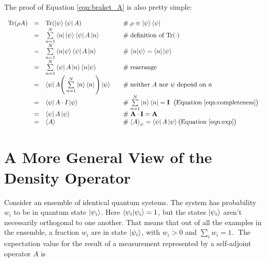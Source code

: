 \documentclass[11pt, oneside]{article}   	%
\begin{document}
\bigskip
\noindent
The proof of Equation \ref{eqn:braket_A} is also pretty simple:

\begin{equation*}
\begin{array}{rcll}
\text{Tr}(\rho A) 
&=& \text{Tr}(\ket{\psi} \bra{\psi}  A)                                                                      & \quad \mathrel{\#} \rho \equiv \ket{\psi} \bra{\psi} \\
&=& \sum\limits_{n = 1}^{N} \bra{n} \ket{\psi} \bra{\psi} A \ket{n}                          & \quad \mathrel{\#} \text{definition of Tr($\cdot$)} \\
&=& \sum\limits_{n = 1}^{N} \braket{n | \psi} \bra{\psi} A \ket{n}                           & \quad \mathrel{\#}  \braket{n | \psi}  =  \bra{n} \ket{\psi}  \\
&=& \sum\limits_{n = 1}^{N} \bra{\psi} A \ket{n} \braket{n | \psi}                           & \quad \mathrel{\#} \text{rearrange} \\
&=& \bra{\psi}  A \Bigg (\sum\limits_{n = 1}^{N} \ket{n} \bra{n} \Bigg ) \ket{\psi}   & \quad \mathrel{\#} \text{neither $A$ nor $\psi$ depend on $n$} \\
&=& \bra{\psi} A  \cdot I  \ket{\psi}                                                                         & \quad \mathrel{\#} \sum\limits_{n = 1}^{N} \ket{n} \bra{n} = \mathbf{I} \;\; \text{\big (Equation \ref{eqn:completeness}} \big )  \\
&=& \bra{\psi} A \ket{\psi}                                                                                      & \quad  \mathrel{\#} \mathbf{A} \cdot \mathbf{I} = \mathbf{A} \\
&=& \braket{A}                                                                                                      & \quad \mathrel{\#} \braket{A}_{\psi} = \bra{\psi} A \ket{\psi}   \big (\text{Equation } \ref{eqn:exp} \big )
\end{array}
\end{equation*}

\bigskip
\section{A More General View of the Density Operator}
Consider an ensemble of identical quantum systems. The system has probability $w_i$ to be in quantum state $\ket{\psi_i}$.  Here $\braket{\psi_i | \psi_i} = 1$,  but
the states $\ket{\psi_i}$ aren't necessarily orthogonal to one another.   That means that out of all the examples in the ensemble, a fraction $w_i$  are in state $\ket{\psi_i}$, with
$w_i  >  0$ and $\sum\limits_{i} w_i = 1$.
\bigskip
\noindent
The expectation value for the result of a measurement represented by a self-adjoint operator $A$ is
\end{document}
